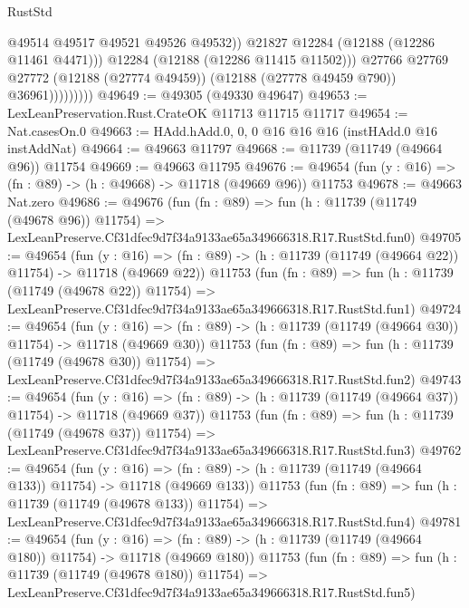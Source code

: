 \begin{lexlean}{RustStd}
\begin{coremodule}
                              @49514
                              @49517
                              @49521
                              @49526
                              @49532))
                          @21827
                          @12284
                          (@12188 (@12286 @11461 @4471)))
                        @12284
                        (@12188 (@12286 @11415 @11502)))
                      @27766
                      @27769
                      @27772
                      (@12188 (@27774 @49459))
                      (@12188 (@27778 @49459 @790))
                      @36961)))))))))
@49649 := @49305 (@49330 @49647)
@49653 := LexLeanPreservation.Rust.CrateOK @11713 @11715 @11717
@49654 := Nat.casesOn.{0}
@49663 := HAdd.hAdd.{0, 0, 0} @16 @16 @16 (instHAdd.{0} @16 instAddNat)
@49664 := @49663 @11797
@49668 := @11739 (@11749 (@49664 @96)) @11754
@49669 := @49663 @11795
@49676 := @49654 (fun (y : @16) => (fn : @89) -> (h : @49668) -> @11718 (@49669 @96)) @11753
@49678 := @49663 Nat.zero
@49686 := @49676
    (fun (fn : @89) =>
    fun (h : @11739 (@11749 (@49678 @96)) @11754) =>
    LexLeanPreserve.Cf31dfec9d7f34a9133ae65a349666318.R17.RustStd.fun0)
@49705 := @49654
    (fun (y : @16) =>
    (fn : @89) -> (h : @11739 (@11749 (@49664 @22)) @11754) -> @11718 (@49669 @22))
    @11753
    (fun (fn : @89) =>
    fun (h : @11739 (@11749 (@49678 @22)) @11754) =>
    LexLeanPreserve.Cf31dfec9d7f34a9133ae65a349666318.R17.RustStd.fun1)
@49724 := @49654
    (fun (y : @16) =>
    (fn : @89) -> (h : @11739 (@11749 (@49664 @30)) @11754) -> @11718 (@49669 @30))
    @11753
    (fun (fn : @89) =>
    fun (h : @11739 (@11749 (@49678 @30)) @11754) =>
    LexLeanPreserve.Cf31dfec9d7f34a9133ae65a349666318.R17.RustStd.fun2)
@49743 := @49654
    (fun (y : @16) =>
    (fn : @89) -> (h : @11739 (@11749 (@49664 @37)) @11754) -> @11718 (@49669 @37))
    @11753
    (fun (fn : @89) =>
    fun (h : @11739 (@11749 (@49678 @37)) @11754) =>
    LexLeanPreserve.Cf31dfec9d7f34a9133ae65a349666318.R17.RustStd.fun3)
@49762 := @49654
    (fun (y : @16) =>
    (fn : @89) -> (h : @11739 (@11749 (@49664 @133)) @11754) -> @11718 (@49669 @133))
    @11753
    (fun (fn : @89) =>
    fun (h : @11739 (@11749 (@49678 @133)) @11754) =>
    LexLeanPreserve.Cf31dfec9d7f34a9133ae65a349666318.R17.RustStd.fun4)
@49781 := @49654
    (fun (y : @16) =>
    (fn : @89) -> (h : @11739 (@11749 (@49664 @180)) @11754) -> @11718 (@49669 @180))
    @11753
    (fun (fn : @89) =>
    fun (h : @11739 (@11749 (@49678 @180)) @11754) =>
    LexLeanPreserve.Cf31dfec9d7f34a9133ae65a349666318.R17.RustStd.fun5)

\end{coremodule}
\end{lexlean}
